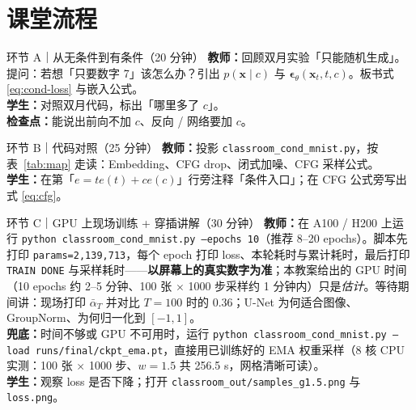 \documentclass[a4paper,fontset=none,zihao=5]{ctexart}
\newcommand{\x}{\mathbf{x}}
\newcommand{\abar}{\bar{\alpha}}
\newcommand{\epst}{\boldsymbol{\epsilon}_\theta}
\newcommand{\code}[1]{\texttt{#1}}
\begin{document}
\section{课堂流程}
\begin{stepbox}{环节 A｜从无条件到有条件（20 分钟）}
\textbf{教师：}回顾双月实验「只能随机生成」。提问：若想「只要数字 7」该怎么办？引出 $p(\x\mid c)$ 与 $\epst(\x_t,t,c)$。板书式 \eqref{eq:cond-loss} 与嵌入公式。\\
\textbf{学生：}对照双月代码，标出「哪里多了 $c$」。\\
\textbf{检查点：}能说出前向不加 $c$、反向 / 网络要加 $c$。
\end{stepbox}

\begin{stepbox}{环节 B｜代码对照（25 分钟）}
\textbf{教师：}投影 \code{classroom\_cond\_mnist.py}，按表~\ref{tab:map} 走读：Embedding、CFG drop、闭式加噪、CFG 采样公式。\\
\textbf{学生：}在第「$e = te(t)+ce(c)$」行旁注释「条件入口」；在 CFG 公式旁写出式 \eqref{eq:cfg}。
\end{stepbox}

\begin{stepbox}{环节 C｜GPU 上现场训练 + 穿插讲解（30 分钟）}
\textbf{教师：}在 A100 / H200 上运行 \code{python classroom\_cond\_mnist.py --epochs 10}（推荐 8–20 epochs）。脚本先打印 \code{params=2,139,713}，每个 epoch 打印 loss、本轮耗时与累计耗时，最后打印 \code{TRAIN DONE} 与采样耗时——\textbf{以屏幕上的真实数字为准}；本教案给出的 GPU 时间（10 epochs 约 2–5 分钟、100 张 $\times$ 1000 步采样约 1 分钟内）只是\emph{估计}。等待期间讲：现场打印 $\abar_T$ 并对比 $T=100$ 时的 $0.36$；U-Net 为何适合图像、GroupNorm、为何归一化到 $[-1,1]$。\\
\textbf{兜底：}时间不够或 GPU 不可用时，运行 \code{python classroom\_cond\_mnist.py --load runs/final/ckpt\_ema.pt}，直接用已训练好的 EMA 权重采样（8 核 CPU 实测：100 张 $\times$ 1000 步、$w=1.5$ 共 256.5 s，网格清晰可读）。\\
\textbf{学生：}观察 loss 是否下降；打开 \code{classroom\_out/samples\_g1.5.png} 与 \code{loss.png}。
\end{stepbox}
\end{document}
